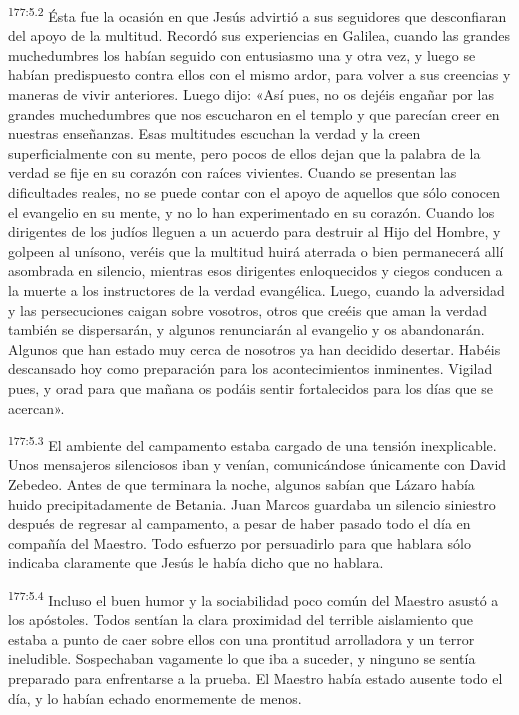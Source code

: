 \par 
\textsuperscript{177:5.2} Ésta fue la ocasión en que Jesús advirtió a sus seguidores que desconfiaran del apoyo de la multitud. Recordó sus experiencias en Galilea, cuando las grandes muchedumbres los habían seguido con entusiasmo una y otra vez, y luego se habían predispuesto contra ellos con el mismo ardor, para volver a sus creencias y maneras de vivir anteriores. Luego dijo: «Así pues, no os dejéis engañar por las grandes muchedumbres que nos escucharon en el templo y que parecían creer en nuestras enseñanzas. Esas multitudes escuchan la verdad y la creen superficialmente con su mente, pero pocos de ellos dejan que la palabra de la verdad se fije en su corazón con raíces vivientes. Cuando se presentan las dificultades reales, no se puede contar con el apoyo de aquellos que sólo conocen el evangelio en su mente, y no lo han experimentado en su corazón. Cuando los dirigentes de los judíos lleguen a un acuerdo para destruir al Hijo del Hombre, y golpeen al unísono, veréis que la multitud huirá aterrada o bien permanecerá allí asombrada en silencio, mientras esos dirigentes enloquecidos y ciegos conducen a la muerte a los instructores de la verdad evangélica. Luego, cuando la adversidad y las persecuciones caigan sobre vosotros, otros que creéis que aman la verdad también se dispersarán, y algunos renunciarán al evangelio y os abandonarán. Algunos que han estado muy cerca de nosotros ya han decidido desertar. Habéis descansado hoy como preparación para los acontecimientos inminentes. Vigilad pues, y orad para que mañana os podáis sentir fortalecidos para los días que se acercan».

\par 
\textsuperscript{177:5.3} El ambiente del campamento estaba cargado de una tensión inexplicable. Unos mensajeros silenciosos iban y venían, comunicándose únicamente con David Zebedeo. Antes de que terminara la noche, algunos sabían que Lázaro había huido precipitadamente de Betania. Juan Marcos guardaba un silencio siniestro después de regresar al campamento, a pesar de haber pasado todo el día en compañía del Maestro. Todo esfuerzo por persuadirlo para que hablara sólo indicaba claramente que Jesús le había dicho que no hablara.

\par 
\textsuperscript{177:5.4} Incluso el buen humor y la sociabilidad poco común del Maestro asustó a los apóstoles. Todos sentían la clara proximidad del terrible aislamiento que estaba a punto de caer sobre ellos con una prontitud arrolladora y un terror ineludible. Sospechaban vagamente lo que iba a suceder, y ninguno se sentía preparado para enfrentarse a la prueba. El Maestro había estado ausente todo el día, y lo habían echado enormemente de menos.

